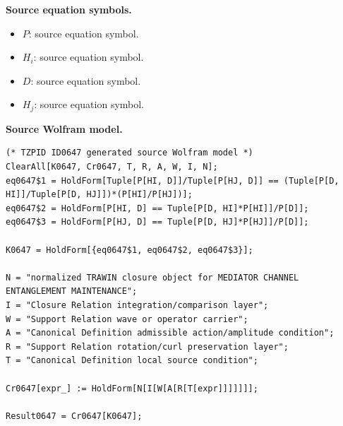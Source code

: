 \begin{minipage}[t]{0.49\linewidth}
\begingroup
\small
\raggedright
\textbf{Source equation symbols.}\par
\begin{itemize}[leftmargin=1.35em,itemsep=1pt,topsep=1pt,parsep=0pt]
    \item $P$: source equation symbol.
    \item $H_i$: source equation symbol.
    \item $D$: source equation symbol.
    \item $H_j$: source equation symbol.
\end{itemize}
\endgroup
\end{minipage}\hfill
\begin{minipage}[t]{0.47\linewidth}
\begingroup
\scriptsize
\raggedright
\textbf{Source Wolfram model.}\par
\begin{Verbatim}[fontsize=\tiny,breaklines=true,breakanywhere=true]
(* TZPID ID0647 generated source Wolfram model *)
ClearAll[K0647, Cr0647, T, R, A, W, I, N];
eq0647$1 = HoldForm[Tuple[P[HI, D]]/Tuple[P[HJ, D]] == (Tuple[P[D, HI]]/Tuple[P[D, HJ]])*(P[HI]/P[HJ])];
eq0647$2 = HoldForm[P[HI, D] == Tuple[P[D, HI]*P[HI]]/P[D]];
eq0647$3 = HoldForm[P[HJ, D] == Tuple[P[D, HJ]*P[HJ]]/P[D]];

K0647 = HoldForm[{eq0647$1, eq0647$2, eq0647$3}];

N = "normalized TRAWIN closure object for MEDIATOR CHANNEL ENTANGLEMENT MAINTENANCE";
I = "Closure Relation integration/comparison layer";
W = "Support Relation wave or operator carrier";
A = "Canonical Definition admissible action/amplitude condition";
R = "Support Relation rotation/curl preservation layer";
T = "Canonical Definition local source condition";

Cr0647[expr_] := HoldForm[N[I[W[A[R[T[expr]]]]]]];

Result0647 = Cr0647[K0647];
\end{Verbatim}
\endgroup
\end{minipage}

